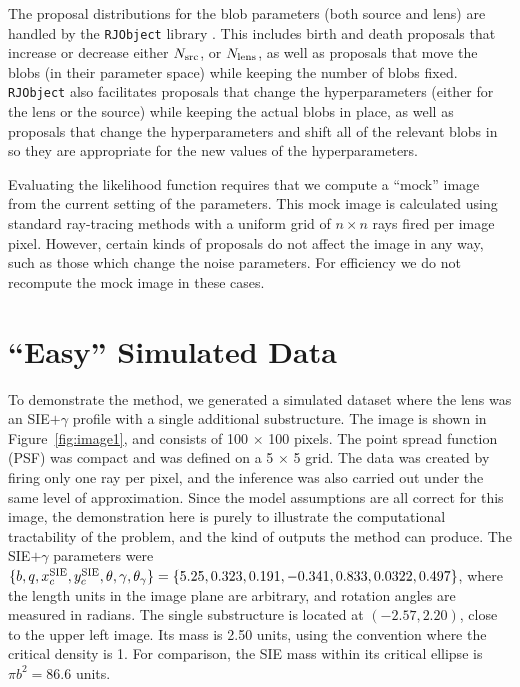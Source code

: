 \documentclass[useAMS,usenatbib]{mn2e}
\newcommand{\revisions}{\color{blue}}
\begin{document}
The proposal distributions for the blob parameters (both source and lens) are
handled by the {\tt RJObject} library \citep{rjobject}. This includes
birth and death proposals that increase or decrease either $N_{\rm src}$,
or $N_{\rm lens}$, as well as proposals that move the blobs (in their parameter
space) while keeping the number of blobs fixed. {\tt RJObject} also
facilitates proposals that change the hyperparameters (either for the lens
or the source) while keeping the actual blobs in place, as well as proposals
that change the hyperparameters and shift all of the relevant blobs in
so they are appropriate for the new values of the hyperparameters.

Evaluating the likelihood function requires that we compute a ``mock'' image from
the current setting of the parameters. This mock image is calculated using
standard ray-tracing methods with a uniform grid of $n \times n$ rays
fired per image pixel. However, certain kinds of proposals do not affect the
image in any way, such as those which change the noise parameters. For efficiency
we do not recompute the mock image in these cases.

\section{{\revisions``Easy''} Simulated Data}
To demonstrate the method, we generated a simulated dataset {\revisions where
the lens was an SIE$+\gamma$ profile with a single additional substructure}.
The image is shown in Figure~\ref{fig:image1}, and
consists of 100 $\times$ 100 pixels. The point spread function (PSF) was compact and was
defined on a 5 $\times$ 5 grid. The data was created by firing only one ray
per pixel, and the inference was also carried out under the same level of
approximation. Since the model assumptions are all correct for this image, the
demonstration here is purely to illustrate the computational tractability of
the problem, and the kind of outputs the method can produce.
{\revisions
The SIE$+\gamma$ parameters were
$\{b, q, x_c^{\rm SIE}, y_c^{\rm SIE}, \theta, \gamma, \theta_\gamma\}
= \{5.25, 0.323, 0.191, -0.341, 0.833, 0.0322, 0.497\}$, where the length
units in the image plane are arbitrary, and rotation angles are measured in
radians. The single substructure is located at $(-2.57, 2.20)$, close to the
upper left image. Its mass is 2.50 units, using the convention where the
critical density is 1. For comparison, the SIE mass within its critical
ellipse is $\pi b^2 = 86.6$ units.
}
\end{document}

